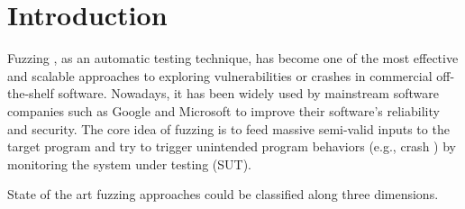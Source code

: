 \section{Introduction}

Fuzzing \cite{li2018fuzzing}, as an automatic testing technique, has become one of the most effective and scalable approaches to exploring vulnerabilities or crashes in commercial off-the-shelf software. Nowadays, it has been widely used by mainstream software companies such as Google \cite{googleossfuzzing} and Microsoft \cite{microfuzzing} to improve their software's reliability and security. The core idea of fuzzing is to feed massive semi-valid inputs to the target program and try to trigger unintended program behaviors (e.g., crash ) by monitoring the system under testing (SUT).

State of the art fuzzing approaches \cite{sutton2007fuzzingbook} \cite{chen2018systematic} could be classified along three dimensions. 

